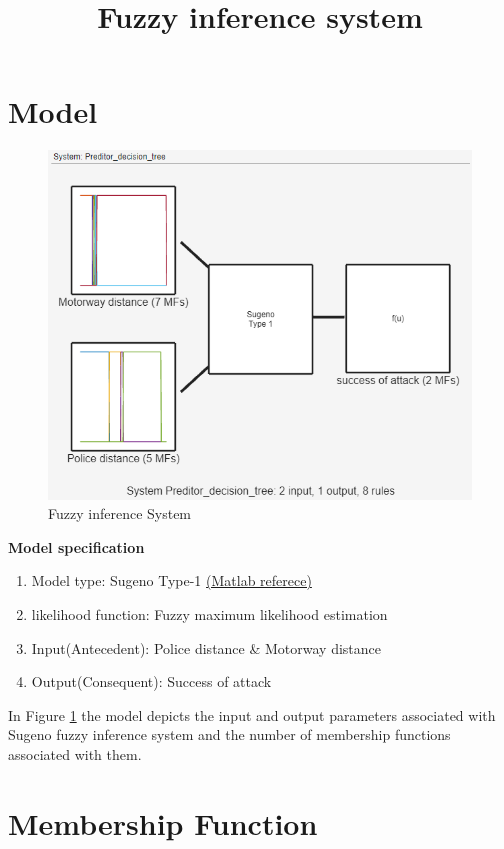 \documentclass[10pt, conference, compsocconf]{IEEEtran}
\title{Fuzzy inference system}
\begin{document}
	
	\maketitle
	
	
	\section{Model}
	\begin{figure}[h!]
		\centering
		\includegraphics[width=\linewidth]{Fuzzy_1.png}
		\caption{Fuzzy inference System}
		\label{fis}
	\end{figure}

    \textbf{Model specification}
    \begin{enumerate}
    	\item Model type: Sugeno Type-1 \href{https://in.mathworks.com/help/fuzzy/types-of-fuzzy-inference-systems.html}{(Matlab referece)}
    	\item likelihood function: Fuzzy maximum likelihood estimation
    	\item Input(Antecedent): Police distance \& Motorway distance
    	\item Output(Consequent): Success of attack
    \end{enumerate}
	\vspace{5pt}
	In Figure \ref{fis} the model depicts the input and output parameters associated with
	Sugeno fuzzy inference system and the number of membership functions associated with them.
 
	
		\section{Membership Function}
		
\end{document}
